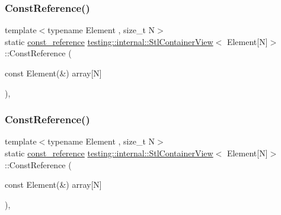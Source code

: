 \subsubsection{\texorpdfstring{ConstReference()}{ConstReference()}\hspace{0.1cm}{\footnotesize\ttfamily [1/3]}}
{\footnotesize\ttfamily template$<$typename Element , size\+\_\+t N$>$ \\
static \mbox{\hyperlink{classtesting_1_1internal_1_1_stl_container_view_3_01_element[_n]_4_a481e6ab99316939484fad9c561af5e28}{const\+\_\+reference}} \mbox{\hyperlink{classtesting_1_1internal_1_1_stl_container_view}{testing\+::internal\+::\+Stl\+Container\+View}}$<$ Element\mbox{[}N\mbox{]}$>$\+::Const\+Reference (\begin{DoxyParamCaption}\item[{const Element(\&)}]{array\mbox{[}\+N\mbox{]} }\end{DoxyParamCaption})\hspace{0.3cm}{\ttfamily [inline]}, {\ttfamily [static]}}

\mbox{\label{classtesting_1_1internal_1_1_stl_container_view_3_01_element[_n]_4_aa1b15d7f43d38751ae19f6dbdcb6aba3}} 
\subsubsection{\texorpdfstring{ConstReference()}{ConstReference()}\hspace{0.1cm}{\footnotesize\ttfamily [2/3]}}
{\footnotesize\ttfamily template$<$typename Element , size\+\_\+t N$>$ \\
static \mbox{\hyperlink{classtesting_1_1internal_1_1_stl_container_view_3_01_element[_n]_4_a481e6ab99316939484fad9c561af5e28}{const\+\_\+reference}} \mbox{\hyperlink{classtesting_1_1internal_1_1_stl_container_view}{testing\+::internal\+::\+Stl\+Container\+View}}$<$ Element\mbox{[}N\mbox{]}$>$\+::Const\+Reference (\begin{DoxyParamCaption}\item[{const Element(\&)}]{array\mbox{[}\+N\mbox{]} }\end{DoxyParamCaption})\hspace{0.3cm}{\ttfamily [inline]}, {\ttfamily [static]}}

